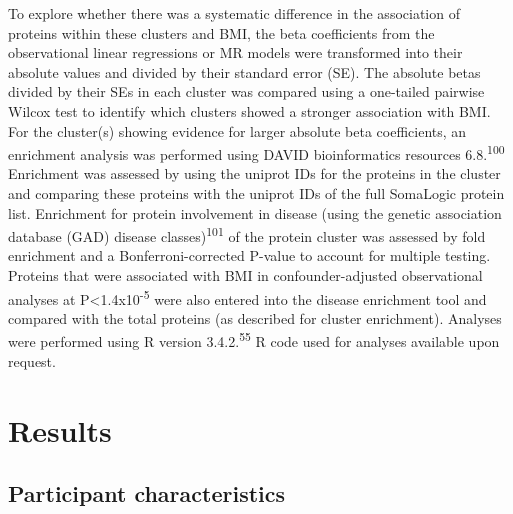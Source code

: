 \documentclass[11pt,twoside]{bristolthesis}
\begin{document}
To explore whether there was a systematic difference in the association of proteins within these clusters and BMI, the beta coefficients from the observational linear regressions or MR models were transformed into their absolute values and divided by their standard error (SE). The absolute betas divided by their SEs in each cluster was compared using a one-tailed pairwise Wilcox test to identify which clusters showed a stronger association with BMI. For the cluster(s) showing evidence for larger absolute beta coefficients, an enrichment analysis was performed using DAVID bioinformatics resources 6.8.\textsuperscript{100} Enrichment was assessed by using the uniprot IDs for the proteins in the cluster and comparing these proteins with the uniprot IDs of the full SomaLogic protein list. Enrichment for protein involvement in disease (using the genetic association database (GAD) disease classes)\textsuperscript{101} of the protein cluster was assessed by fold enrichment and a Bonferroni-corrected P-value to account for multiple testing. Proteins that were associated with BMI in confounder-adjusted observational analyses at P\textless1.4x10\textsuperscript{-5} were also entered into the disease enrichment tool and compared with the total proteins (as described for cluster enrichment). Analyses were performed using R version 3.4.2.\textsuperscript{55} R code used for analyses available upon request.

\hypertarget{results-3}{%
\section{Results}\label{results-3}}

\hypertarget{participant-characteristics-1}{%
\subsection{Participant characteristics}\label{participant-characteristics-1}}
\end{document}
